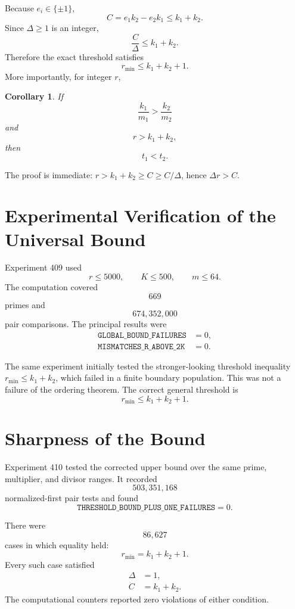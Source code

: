 \documentclass[11pt,a4paper]{article}
\newtheorem{corollary}{Corollary}
\begin{document}
Because $e_i\in\{\pm1\}$,
\begin{equation}
    C=e_1k_2-e_2k_1\le k_1+k_2.
\end{equation}
Since $\Delta\ge1$ is an integer,
\begin{equation}
    \frac{C}{\Delta}\le k_1+k_2.
\end{equation}
Therefore the exact threshold satisfies
\begin{equation}
    r_{\min}\le k_1+k_2+1.
\end{equation}
More importantly, for integer $r$,
\begin{corollary}
If
\[
    \frac{k_1}{m_1}>\frac{k_2}{m_2}
\]
and
\[
    r>k_1+k_2,
\]
then
\[
    t_1<t_2.
\]
\end{corollary}

The proof is immediate: $r>k_1+k_2\ge C\ge C/\Delta$, hence $\Delta r>C$.

\section{Experimental Verification of the Universal Bound}

Experiment 409 used
\[
    r\le5000,
    \qquad
    K\le500,
    \qquad
    m\le64.
\]
The computation covered
\[
    669
\]
primes and
\[
    674{,}352{,}000
\]
pair comparisons. The principal results were
\begin{align*}
    \texttt{GLOBAL\_BOUND\_FAILURES}&=0,\\
    \texttt{MISMATCHES\_R\_ABOVE\_2K}&=0.
\end{align*}

The same experiment initially tested the stronger-looking threshold inequality $r_{\min}\le k_1+k_2$, which failed in a finite boundary population. This was not a failure of the ordering theorem. The correct general threshold is
\[
    r_{\min}\le k_1+k_2+1.
\]

\section{Sharpness of the Bound}

Experiment 410 tested the corrected upper bound over the same prime, multiplier, and divisor ranges. It recorded
\[
    503{,}351{,}168
\]
normalized-first pair tests and found
\[
    \texttt{THRESHOLD\_BOUND\_PLUS\_ONE\_FAILURES}=0.
\]

There were
\[
    86{,}627
\]
cases in which equality held:
\begin{equation}
    r_{\min}=k_1+k_2+1.
\end{equation}
Every such case satisfied
\begin{align}
    \Delta&=1,\\
    C&=k_1+k_2.
\end{align}
The computational counters reported zero violations of either condition.
\end{document}
